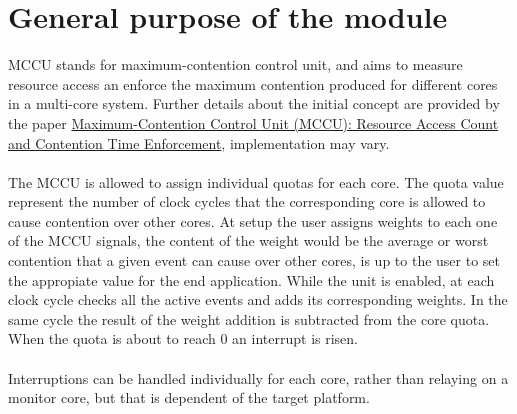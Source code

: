 \newpage
\section{General purpose of the module}
MCCU stands for maximum-contention control unit, and aims to measure resource access an enforce the maximum contention produced for different cores in a multi-core system. Further details about the initial concept are provided by the paper \href{https://upcommons.upc.edu/handle/2117/133656}{Maximum-Contention Control Unit (MCCU): Resource Access Count and Contention Time Enforcement}, implementation may vary.\\
\\ 
The MCCU is allowed to assign individual quotas for each core. The quota value represent the number of clock cycles that the corresponding core is allowed to cause contention over other cores. At setup the user assigns weights to each one of the MCCU signals, the content of the weight would be the average or worst contention that a given event can cause over other cores, is up to the user to set the appropiate value for the end application. While the unit is enabled, at each clock cycle checks all the active events and adds its corresponding weights. In the same cycle the result of the weight addition is subtracted from the core quota. When the quota is about to reach 0 an interrupt is risen.\\
\\
Interruptions can be handled individually for each core, rather than relaying on a monitor core, but that is dependent of the target platform. 